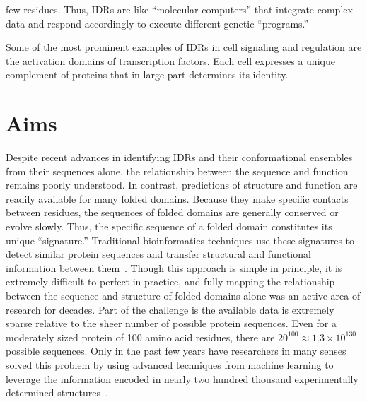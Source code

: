 few residues. Thus, IDRs are like ``molecular computers'' that integrate complex data and respond accordingly to execute different genetic ``programs.''

Some of the most prominent examples of IDRs in cell signaling and regulation are the activation domains of transcription factors. Each cell expresses a unique complement of proteins that in large part determines its identity.



\section{Aims}

Despite recent advances in identifying IDRs and their conformational ensembles from their sequences alone, the relationship between the sequence and function remains poorly understood. In contrast, predictions of structure and function are readily available for many folded domains. Because they make specific contacts between residues, the sequences of folded domains are generally conserved or evolve slowly. Thus, the specific sequence of a folded domain constitutes its unique ``signature.'' Traditional bioinformatics techniques use these signatures to detect similar protein sequences and transfer structural and functional information between them~\cite{Camacho2009, Eddy2009, Mistry2020}. Though this approach is simple in principle, it is extremely difficult to perfect in practice, and fully mapping the relationship between the sequence and structure of folded domains alone was an active area of research for decades. Part of the challenge is the available data is extremely sparse relative to the sheer number of possible protein sequences. Even for a moderately sized protein of 100 amino acid residues, there are $20^{100} \approx 1.3 \times 10^{130}$ possible sequences. Only in the past few years have researchers in many senses solved this problem by using advanced techniques from machine learning to leverage the information encoded in nearly two hundred thousand experimentally determined structures~\cite{Jumper2021}.

